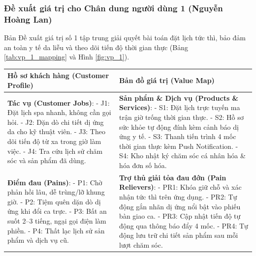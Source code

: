 \subsubsection{Đề xuất giá trị cho Chân dung người dùng 1 (Nguyễn Hoàng Lan)}
Bản Đề xuất giá trị số 1 tập trung giải quyết bài toán đặt lịch tức thì, bảo đảm an toàn y tế da liễu và theo dõi tiến độ thời gian thực (Bảng \ref{tab:vp_1_mapping} và Hình \ref{fig:vp_1}).

\begin{table}[H]
\centering
\small
\begin{tabularx}{\textwidth}{|X|X|}
\hline
\textbf{Hồ sơ khách hàng (Customer Profile)} & \textbf{Bản đồ giá trị (Value Map)} \\ \hline
\textbf{Tác vụ (Customer Jobs)}: \newline
- J1: Đặt lịch spa nhanh, không cần gọi hỏi. \newline
- J2: Dặn dò chi tiết dị ứng da cho kỹ thuật viên. \newline
- J3: Theo dõi tiến độ từ xa trong giờ làm việc. \newline
- J4: Tra cứu lịch sử chăm sóc và sản phẩm đã dùng. & \textbf{Sản phẩm \& Dịch vụ (Products \& Services)}: \newline
- S1: Đặt lịch trực tuyến ma trận giờ trống thời gian thực. \newline
- S2: Hồ sơ sức khỏe tự động đính kèm cảnh báo dị ứng y tế. \newline
- S3: Thanh tiến trình 4 mốc thời gian thực kèm Push Notification. \newline
- S4: Kho nhật ký chăm sóc cá nhân hóa \& hóa đơn số hóa. \\ \hline
\textbf{Điểm đau (Pains)}: \newline
- P1: Chờ phản hồi lâu, dễ trùng/lỡ khung giờ. \newline
- P2: Tiệm quên dặn dò dị ứng khi đổi ca trực. \newline
- P3: Bất an suốt 2--3 tiếng, ngại gọi điện làm phiền. \newline
- P4: Thất lạc lịch sử sản phẩm và dịch vụ cũ. & \textbf{Trợ thủ giải tỏa đau đớn (Pain Relievers)}: \newline
- PR1: Khóa giữ chỗ và xác nhận tức thì trên ứng dụng. \newline
- PR2: Tự động gắn nhãn dị ứng nổi bật vào phiếu bàn giao ca. \newline
- PR3: Cập nhật tiến độ tự động qua thông báo đẩy 4 mốc. \newline
- PR4: Tự động lưu trữ chi tiết sản phẩm sau mỗi lượt chăm sóc. \\ \hline

\end{tabularx}
\end{table}
